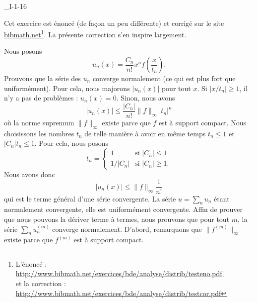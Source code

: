 

\begin{corrige}{_I-1-16}

Cet exercice est énoncé (de façon un peu différente) et corrigé sur le site \href{http://www.bibmath.net}{bibmath.net}\footnote{L'énoncé : \href{http://www.bibmath.net/exercices/bde/analyse/distrib/testeno.pdf}{http://www.bibmath.net/exercices/bde/analyse/distrib/testeno.pdf},\\ et la correction : \href{http://www.bibmath.net/exercices/bde/analyse/distrib/testcor.pdf}{http://www.bibmath.net/exercices/bde/analyse/distrib/testcor.pdf}}. La présente correction s'en inspire largement.

Nous posons
\begin{equation}
	u_n(x)=\frac{ C_n }{ n! }x^nf(\frac{ x }{ t_n }).
\end{equation}
Prouvons que la série des $u_n$ converge normalement (ce qui est plus fort que uniformément). Pour cela, nous majorons $| u_n(x) |$ pour tout $x$. Si $| x/t_n |\geq 1$, il n'y a pas de problèmes : $u_n(x)=0$. Sinon, nous avons
\begin{equation}		\label{EqMajorationBorel16}
	| u_n(x) |\leq\frac{ | C_n | }{ n! }\| f \|_{\infty}| t_n |^n
\end{equation}
où la norme supremum $\| f \|_{\infty}$ existe parce que $f$ est à support compact. Nous choisissons les nombres $t_n$ de telle manière à avoir en même temps $t_n\leq 1$ et $| C_n |t_n\leq 1$. Pour cela, nous posons
\begin{equation}
	t_n=\begin{cases}
	1	&	\text{si $|C_n|\leq 1$}\\
	1/|C_n|	&	 \text{si $| C_n |\geq 1$.}
\end{cases}
\end{equation}
Nous avons donc
\begin{equation}
	| u_n(x) |\leq \| f \|_{\infty}\frac{1}{ n! }
\end{equation}
qui est le terme général d'une série convergente. La série $u=\sum_n u_n$ étant normalement convergente, elle est uniformément convergente. Affin de prouver que nous pouvons la dériver terme à termes, nous prouvons que pour tout $m$, la série $\sum_n u_n^{(m)}$ converge normalement. D'abord, remarquons que $\| f^{(m)} \|_{\infty}$ existe parce que $f^{(m)}$ est à support compact.


\end{corrige}
